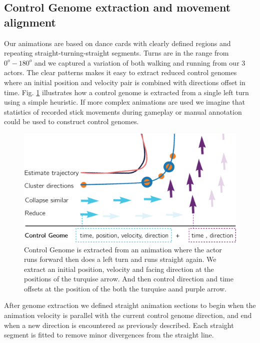 \subsection{Control Genome extraction and movement alignment}
Our animations are based on dance cards with clearly defined regions and repeating straight-turning-straight segments. Turns are in the range from $0^o-180^o$ and we captured a variation of both walking and running from our 3 actors. The clear patterns makes it easy to extract reduced control genomes where an initial position and velocity pair is combined with directions offset in time. Fig. \ref{fig:results:genome_extraction} illustrates how a control genome is extracted from a single left turn using a simple heuristic. If more complex animations are used we imagine that statistics of recorded stick movements during gameplay or manual annotation could be used to construct control genomes. 
\begin{figure}
    \centering
    \includegraphics[width=1.0\columnwidth]{img/genome_extract.png}
    \caption{Control Genome is extracted from an animation where the actor runs forward then does a left turn and runs straight again. We extract an initial position, velocity and facing direction at the positions of the turquise arrow. And then control direction and time offsets at the position of the both the turquise aand purple arrow.}
    \label{fig:results:genome_extraction}
\end{figure}

After genome extraction we defined straight animation sections to begin when the animation velocity is parallel with the current control genome direction, and end when a new direction is encountered as previously described. Each straight segment is fitted to remove minor divergences from the straight line.

